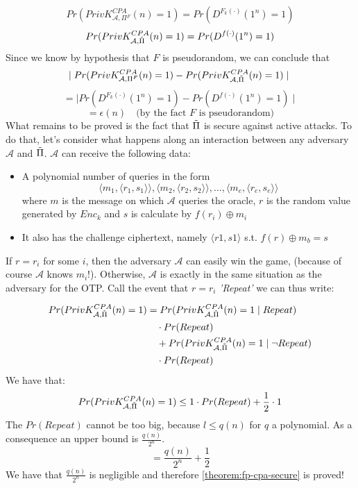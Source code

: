 \documentclass[../main]{subfiles}
\begin{document}
$$Pr(PrivK^{CPA}_{\mathcal{A}, \Pi{}^F}(n) = 1) = Pr(D^{F_k(\cdot{})}(1^n) = 1)$$
$$Pr(PrivK^{CPA}_{\mathcal{A}, \Tilde{\Pi{}}}(n) = 1) = Pr(D^{f(\cdot{})}(1^n) = 1)$$
Since we know by hypothesis that $F$ is pseudorandom, we can conclude that $$\mid{} Pr(PrivK^{CPA}_{\mathcal{A}, \Pi{}^F}(n) = 1) - Pr(PrivK^{CPA}_{\mathcal{A}, \Tilde{\Pi{}}}(n) = 1) \mid{}$$
$$= \mid{} Pr(D^{F_k(\cdot{})}(1^n) = 1) - Pr(D^{f(\cdot{})}(1^n) = 1) \mid{}$$
$$= \epsilon(n) \quad \text{(by the fact $F$ is pseudorandom)}$$
What remains to be proved is the fact that $\Tilde{\Pi{}}$ is secure against active attacks.
To do that, let's consider what happens along an interaction between any adversary $\mathcal{A}$ and $\Tilde{\Pi{}}$. $\mathcal{A}$ can receive the following data:
\begin{itemize}
    \item A polynomial number of queries in the form $$\langle{} m_1, \langle{} r_1, s_1 \rangle{} \rangle{}, \langle{} m_2, \langle{} r_2, s_2 \rangle{} \rangle{}, \ldots{}, \langle{} m_e, \langle{} r_e, s_e \rangle{} \rangle{}$$ where $m$ is the message on which $\mathcal{A}$ queries the oracle, $r$ is the random value generated by $Enc_k$ and $s$ is calculate by $f(r_i) \oplus{} m_i$
    \item It also has the challenge ciphertext, namely $\langle{} r1, s1 \rangle{}$ s.t. $f(r) \oplus{} m_b = s$
\end{itemize}
If $r=r_i$ for some $i$, then the adversary $\mathcal{A}$ can easily win the game, (because of course $\mathcal{A}$ knows $m_i$!).
Otherwise, $\mathcal{A}$ is exactly in the same situation as the adversary for the OTP.
Call the event that $r=r_i$ \textit{'Repeat'} we can thus write:

\begin{equation*}
    \begin{split}
        Pr(PrivK^{CPA}_{\mathcal{A}, \Tilde{\Pi{}}}(n) = 1) &= Pr(PrivK^{CPA}_{\mathcal{A}, \Tilde{\Pi{}}}(n) = 1 \mid{} Repeat)\\
        &\quad{} \cdot{} Pr(Repeat) \\
        &\quad{} + Pr(PrivK^{CPA}_{\mathcal{A}, \Tilde{\Pi{}}}(n) = 1 \mid{} \neg{} Repeat) \\
        &\quad{} \cdot{} Pr(Repeat)
    \end{split}
\end{equation*}
\noindent
We have that:
$$Pr(PrivK^{CPA}_{\mathcal{A}, \Tilde{\Pi{}}}(n) = 1) \leq{} 1 \cdot{} Pr(Repeat) + \frac{1}{2} \cdot{} 1 $$
The $Pr(Repeat)$ cannot be too big, because $\mathbb{}{l} \leq{} q(n)$ for $q$ a polynomial. As a consequence an upper bound is $\frac{q(n)}{2^n}$.
$$= \frac{q(n)}{2^n} + \frac{1}{2}$$
We have that $ \frac{q(n)}{2^n} $ is negligible and therefore \ref{theorem:fp-cpa-secure} is proved!
\end{document}
